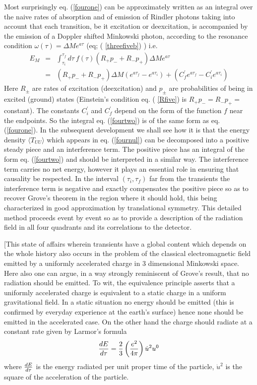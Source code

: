 \documentclass[12pt,oneside]{report}
\def\om{\omega	}
\begin{document}
 Most surprisingly eq. (\ref{fourone}) can be approximately written as an
integral over the naive rates of absorption and of emission of Rindler
photons taking into account that each transition, be it excitation or
deexcitation, is accompanied by the emission of a Doppler shifted Minkowski
photon, according to the resonance condition $\om(\tau) = \Delta M e^{a\tau}$
(eq; ( \ref{threefiveb}) )
i.e.
\begin{eqnarray} E_M &=& \int_{\tau_i}^{\tau_f}\! d\tau \ f(\tau)( R_+ p_- +
R_- p_+ ) \Delta M e^{a\tau }\nonumber\\
&=&( R_+ p_- +
R_- p_+ ) \Delta M ( e^{a\tau_f } - e^{a \tau_i}) +( C^\prime_f e^{a \tau_f} 
-C^\prime_i e^{a \tau_i})
\label{fourtwo}
\end{eqnarray}
Here $R_\pm$ are rates of excitation (deexcitation) and $p_\pm$ are
probabilities of being in excited (ground) states (Einstein's condition
eq. ( \ref{Rfive}) is $R_+ p_- = R_- p_+ =$constant). The constants
$C^\prime_i$ and $C^\prime_f$
 depend on the form of the function $f$ near the endpoints. So the
integral eq. (\ref{fourtwo}) is of the same form as eq. (\ref{fourone}). In the
subsequent development we shall see how it is that the energy density
$\langle T_{UU} \rangle$ which appears in eq. (\ref{fournul}) can be decomposed into a positive
steady piece and an interference term. The positive piece has an integral of the
form eq. (\ref{fourtwo}) and should be interpreted in a similar way. The
interference term carries no net energy, however it plays an essential role in
ensuring that causality be respected. In the interval $(\tau_i,\tau_f)$ far from
the transients the interference term is negative and exactly compensates the
positive piece  so as
to recover Grove's theorem in the region where it should hold, this being
characterized in good approximation by translational symmetry. This
detailed method proceeds event by event so as to provide a description of
the radiation field in all four quadrants and its correlations to the
detector. 

[This state of affairs wherein transients have a global content which
depends on the whole history also occurs in the problem of the classical
electromagnetic field emitted by a uniformly accelerated charge in 3
dimensional Minkowski space. Here also one can argue, in a way strongly
reminiscent of Grove's result, that no radiation should be emitted. To wit,
the equivalence principle asserts that a uniformly accelerated charge is
equivalent to a static charge in a uniform gravitational field. In a
static situation no energy should be emitted (this is confirmed by everyday
experience at the earth's surface) hence none should be emitted in the
accelerated case. On the  other hand the charge should radiate at a constant
rate given by Larmor's formula \begin{equation} {dE \over d\tau} = {2 \over 3}
\left( e^2 \over 4 \pi \right) \dot u^2 u^0 \label{Bone}
\end{equation}
where ${dE \over d\tau}$ is the energy radiated per unit proper time of the
particle, $\dot u^2$ is the square of the acceleration of the particle. 
\end{document}
